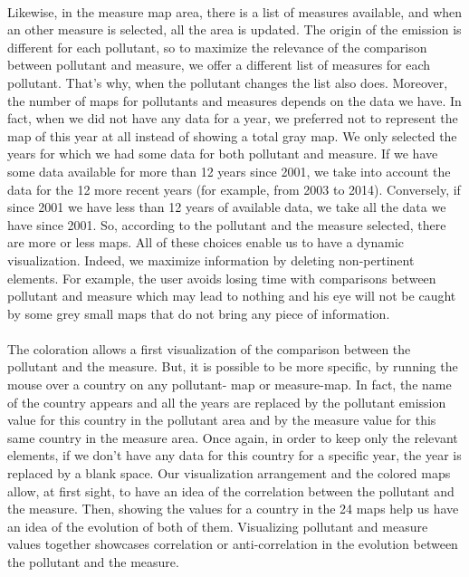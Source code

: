 \documentclass[preprint,journal]{vgtc}       %
\begin{document}
\paragraph{}
Likewise, in the measure map area, there is a list of measures available, and when an other measure is selected, all the area is updated. The origin of the emission is different for each pollutant, so to maximize the relevance of the comparison between pollutant and measure, we offer a different list of measures for each pollutant. That’s why, when the pollutant changes the list also does.
\newline
Moreover, the number of maps for pollutants and measures depends on the data we have. In fact, when we did not have any data for a year, we preferred not to represent the map of this year at all instead of showing a total gray map. We only selected the years for which we had some data for both pollutant and measure. If we have some data available for more than 12 years since 2001, we take into account the data for the 12 more recent years (for example, from 2003 to 2014). Conversely, if since 2001 we have less than 12 years of available data, we take all the data we have since 2001. So, according to the pollutant and the measure selected, there are more or less maps.
\newline
All of these choices enable us to have a dynamic visualization. Indeed, we maximize information by deleting non-pertinent elements. For example, the user avoids losing time with comparisons between pollutant and measure which may lead to nothing and his eye will not be caught by some grey small maps that do not bring any piece of information.
\paragraph{}
The coloration allows a first visualization of the comparison between the pollutant and the measure. But, it is possible to be more specific, by running the mouse over a country on any pollutant- map or measure-map. In fact, the name of the country appears and all the years are replaced by the pollutant emission value for this country in the pollutant area and by the measure value for this same country in the measure area. Once again, in order to keep only the relevant elements, if we don’t have any data for this country for a specific year, the year is replaced by a blank space.
\newline
Our visualization arrangement and the colored maps allow, at first sight, to have an idea of the correlation between the pollutant and the measure. Then, showing the values for a country in the 24 maps help us have an idea of the evolution of both of them. Visualizing pollutant and measure values together showcases correlation or anti-correlation in the evolution between the pollutant and the measure.
\end{document}
